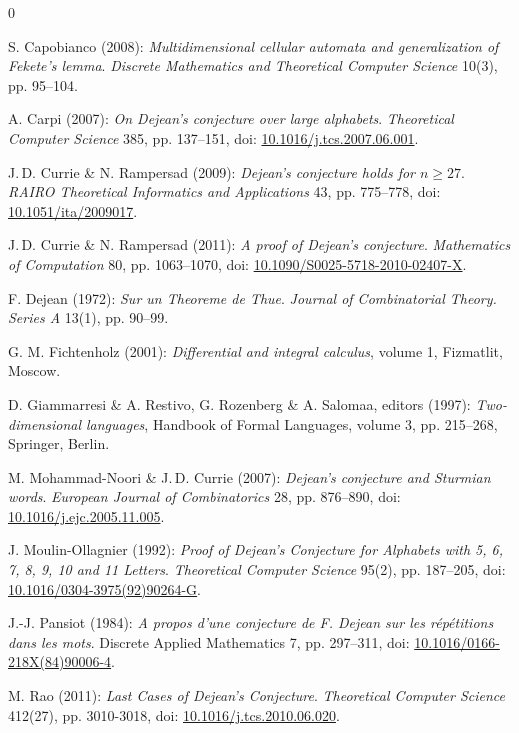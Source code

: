 \documentclass[submission,copyright]{eptcs}\providecommand{\event}{WORDS 2011}
\begin{document}

\begin {thebibliography} {0}
\providecommand{\doi}[1]{\href{http://dx.doi.org/#1}{#1}}

S. Capobianco (2008): \textit{Multidimensional cellular automata and generalization of Fekete's lemma}. {\slshape Discrete Mathematics and Theoretical Computer Science} 10(3), pp. 95--104.

A. Carpi (2007): {\it On Dejean's conjecture over large alphabets}. {\slshape Theoretical Computer Science} 385, pp. 137--151, doi: \doi{10.1016/j.tcs.2007.06.001}.

J.\,D. Currie \& N. Rampersad (2009): {\it Dejean's conjecture holds for $n\ge27$}. {\slshape RAIRO Theoretical Informatics and Applications } 43, pp. 775--778, doi: \doi{10.1051/ita/2009017}.

J.\,D. Currie \& N. Rampersad (2011): {\it A proof of Dejean's conjecture}. {\slshape Mathematics of Computation}  80, pp. 1063--1070, doi: \doi{10.1090/S0025-5718-2010-02407-X}.

F. Dejean (1972): {\it Sur un Theoreme de Thue}. {\slshape Journal of Combinatorial Theory. Series A} 13(1), pp. 90--99.

G. M. Fichtenholz (2001): \textit{Differential and integral calculus}, volume 1, Fizmatlit, Moscow.

D. Giammarresi \& A. Restivo,  G. Rozenberg \& A. Salomaa, editors (1997): \textit{Two-dimensional languages}, Handbook of Formal Languages, volume 3, pp. 215--268, Springer, Berlin. 

M. Mohammad-Noori \& J.\,D. Currie (2007): {\it Dejean's conjecture and Sturmian words}. {\slshape European Journal of Combinatorics} 28, pp. 876--890, doi: \doi{10.1016/j.ejc.2005.11.005}.

J. Moulin-Ollagnier (1992): {\it Proof of Dejean's Conjecture for Alphabets with 5, 6, 7, 8, 9, 10 and 11 Letters}. {\slshape Theoretical Computer Science} 95(2), pp. 187--205, doi: \doi{10.1016/0304-3975(92)90264-G}.

J.-J. Pansiot (1984): {\it A propos d'une conjecture de F. Dejean sur les r\'ep\'etitions dans les mots}. {Discrete Applied Mathematics} 7, pp. 297--311, doi: \doi{10.1016/0166-218X(84)90006-4}.

M. Rao (2011): {\it Last Cases of Dejean's Conjecture}. {\slshape Theoretical Computer Science} 412(27), pp. 3010-3018, doi: \doi{10.1016/j.tcs.2010.06.020}.


\end{thebibliography}
\end{document}
